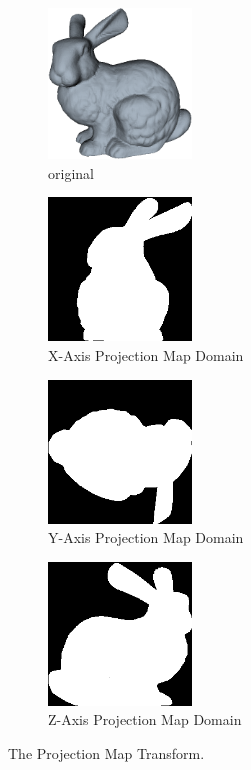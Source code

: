 \begin{figure}[!htb]
        \centering
        \begin{subfigure}[b]{1.5in}
                \includegraphics[width=1.5in]{images/ch2/bunny}
                \caption{original}
                \label{fig:bunnyOrigAA2}
        \end{subfigure}%
        \begin{subfigure}[b]{1.5in}
                \includegraphics[width=1.5in]{images/methodology/FVR/xaxis}
                \caption{X-Axis Projection Map Domain}
                \label{fig:xaxPMDOM}
        \end{subfigure}
        \begin{subfigure}[b]{1.5in}
                \includegraphics[width=1.5in]{images/methodology/FVR/yaxis}
                \caption{Y-Axis Projection Map Domain}
                \label{fig:yaxPMDOM}
        \end{subfigure}%
        \begin{subfigure}[b]{1.5in}
                \includegraphics[width=1.5in]{images/methodology/FVR/zaxis}
                \caption{Z-Axis Projection Map Domain}
                \label{fig:zaxPMDOM}
        \end{subfigure}
        \caption{The Projection Map Transform.}
       \label{fig:pmtExample}
\end{figure}


